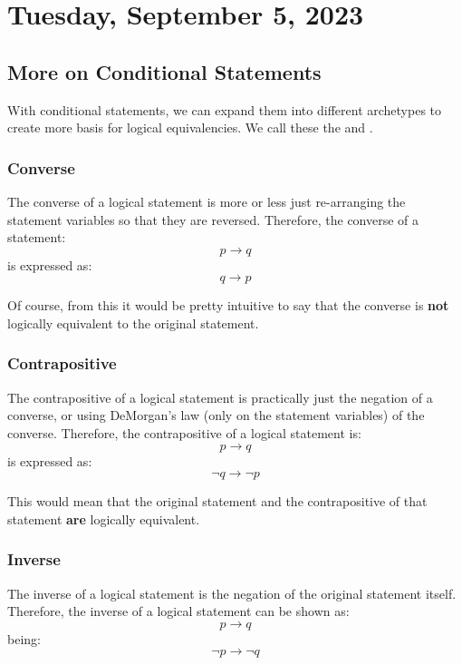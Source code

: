 \section{Tuesday, September 5, 2023}

\subsection{More on Conditional Statements}
With conditional statements, we can expand them into different archetypes to create more basis for logical equivalencies. We call these the and .

\subsubsection{Converse}
The converse of a logical statement is more or less just re-arranging the statement variables so that they are reversed. Therefore, the converse of a statement:
\begin{displaymath}
    p \rightarrow q
\end{displaymath}
is expressed as:
\begin{displaymath}
    q \rightarrow p
\end{displaymath}

Of course, from this it would be pretty intuitive to say that the converse is \textbf{not} logically equivalent to the original statement.

\subsubsection{Contrapositive}
The contrapositive of a logical statement is practically just the negation of a converse, or using DeMorgan's law (only on the statement variables) of the converse. Therefore, the contrapositive of a logical statement is:
\begin{displaymath}
    p \rightarrow q
\end{displaymath}
is expressed as:
\begin{displaymath}
    \neg q \rightarrow \neg p
\end{displaymath}

This would mean that the original statement and the contrapositive of that statement \textbf{are} logically equivalent.

\subsubsection{Inverse}
The inverse of a logical statement is the negation of the original statement itself. Therefore, the inverse of a logical statement can be shown as:
\begin{displaymath}
    p \rightarrow q
\end{displaymath}
being:
\begin{displaymath}
    \neg p \rightarrow \neg q
\end{displaymath}


